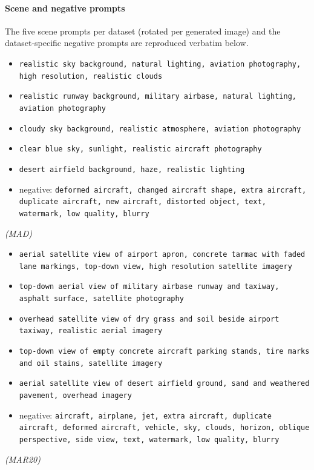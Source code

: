 \paragraph{Scene and negative prompts}
The five scene prompts per dataset (rotated per generated image) and the dataset-specific negative prompts are reproduced verbatim below.
\begin{itemize}\small
\item[] \texttt{realistic sky background, natural lighting, aviation photography, high resolution, realistic clouds}
\item[] \texttt{realistic runway background, military airbase, natural lighting, aviation photography}
\item[] \texttt{cloudy sky background, realistic atmosphere, aviation photography}
\item[] \texttt{clear blue sky, sunlight, realistic aircraft photography}
\item[] \texttt{desert airfield background, haze, realistic lighting}
\item[] negative: \texttt{deformed aircraft, changed aircraft shape, extra aircraft, duplicate aircraft, new aircraft, distorted object, text, watermark, low quality, blurry}
\end{itemize}
\noindent\emph{(MAD)}\medskip
\begin{itemize}\small
\item[] \texttt{aerial satellite view of airport apron, concrete tarmac with faded lane markings, top-down view, high resolution satellite imagery}
\item[] \texttt{top-down aerial view of military airbase runway and taxiway, asphalt surface, satellite photography}
\item[] \texttt{overhead satellite view of dry grass and soil beside airport taxiway, realistic aerial imagery}
\item[] \texttt{top-down view of empty concrete aircraft parking stands, tire marks and oil stains, satellite imagery}
\item[] \texttt{aerial satellite view of desert airfield ground, sand and weathered pavement, overhead imagery}
\item[] negative: \texttt{aircraft, airplane, jet, extra aircraft, duplicate aircraft, deformed aircraft, vehicle, sky, clouds, horizon, oblique perspective, side view, text, watermark, low quality, blurry}
\end{itemize}
\noindent\emph{(MAR20)}
